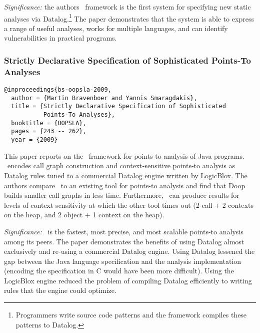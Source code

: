 \documentclass{article}
\begin{document}
\emph{Significance:} the authors \bddbddb\ framework is the first system for specifying new static analyses via Datalog.\footnote{Programmers write source code patterns and the framework compiles these patterns to Datalog.}
The paper demonstrates that the system is able to express a range of useful analyses, works for multiple languages, and can identify vulnerabilities in practical programs.


\newpage
\subsubsection*{Strictly Declarative Specification of Sophisticated Points-To Analyses}
\begin{verbatim}
@inproceedings{bs-oopsla-2009,
  author = {Martin Bravenboer and Yannis Smaragdakis},
  title = {Strictly Declarative Specification of Sophisticated
           Points-To Analyses},
  booktitle = {OOPSLA},
  pages = {243 -- 262},
  year = {2009}
\end{verbatim}

This paper reports on the \doop\ framework for points-to analysis of Java programs.
\doop\ encodes call graph construction and context-sensitive points-to analysis as Datalog rules tuned to a commercial Datalog engine written by \href{http://www.logicblox.com/}{LogicBlox}.
The authors compare \doop\ to an existing tool for points-to analysis and find that Doop builds smaller call graphs in less time.
Furthermore, \doop\ can produce results for levels of context sensitivity at which the other tool times out (2-call + 2 contexts on the heap, and 2 object + 1 context on the heap).


\emph{Significance:} \doop\ is the fastest, most precise, and most scalable points-to analysis among its peers.
The paper demonstrates the benefits of using Datalog almost exclusively and re-using a commercial Datalog engine.
Using Datalog lessened the gap between the Java language specification and the analysis implementation (encoding the specification in C would have been more difficult).
Using the LogicBlox engine reduced the problem of compiling Datalog efficiently to writing rules that the engine could optimize.
\end{document}
